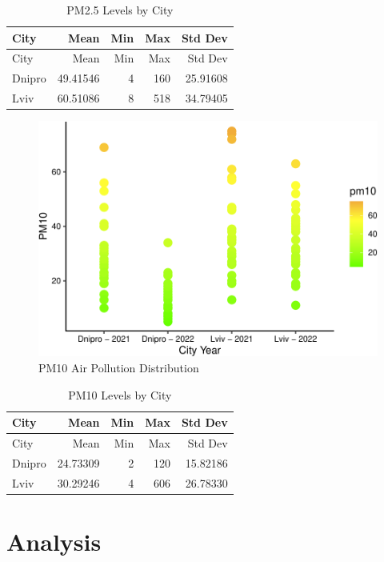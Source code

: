 \documentclass[
  12pt,
]{article}
\begin{document}
\hfill\break

\begin{longtable}[]{@{}lrrrr@{}}
\caption{PM2.5 Levels by City}\tabularnewline
\toprule
City & Mean & Min & Max & Std Dev \\
\midrule
\endfirsthead
\toprule
City & Mean & Min & Max & Std Dev \\
\midrule
\endhead
Dnipro & 49.41546 & 4 & 160 & 25.91608 \\
Lviv & 60.51086 & 8 & 518 & 34.79405 \\
\bottomrule
\end{longtable}

\newpage

\begin{figure}
\centering
\includegraphics{Fontanie_Gordon_Weinberg_Project_files/figure-latex/plot of PM10 air pollution by city year-1.pdf}
\caption{PM10 Air Pollution Distribution}
\end{figure}

\begin{longtable}[]{@{}lrrrr@{}}
\caption{PM10 Levels by City}\tabularnewline
\toprule
City & Mean & Min & Max & Std Dev \\
\midrule
\endfirsthead
\toprule
City & Mean & Min & Max & Std Dev \\
\midrule
\endhead
Dnipro & 24.73309 & 2 & 120 & 15.82186 \\
Lviv & 30.29246 & 4 & 606 & 26.78330 \\
\bottomrule
\end{longtable}

\newpage

\hypertarget{analysis}{%
\section{Analysis}\label{analysis}}
\end{document}
